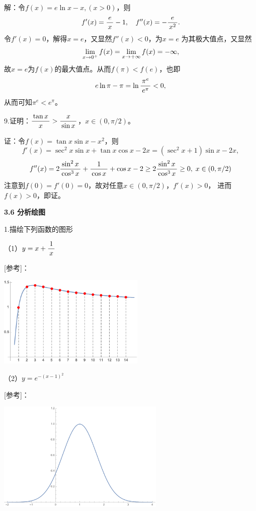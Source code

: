 
解：令$f(x)=e\ln x-x,(x>0)$，则
$$f'(x)=\displaystyle\frac{\,{e}\,}{\,{x}\,}-1,\quad f''(x)=-\displaystyle\frac{\,{e}\,}{\,{x^2}\,}.$$
令$f'(x)=0$，解得$x=e$，又显然$f''(x)<0$，为$x=e$
为其极大值点，又显然
$$\lim\limits_{x\to{0^+}}f(x)=\lim\limits_{x\to{+\infty}}f(x)=-\infty,$$
故$x=e$为$f(x)$的最大值点。从而$f(\pi)<f(e)$，也即
$$e\ln\pi-\pi=\ln\displaystyle\frac{\,{\pi^e}\,}{\,{e^{\pi}}\,}
<0,$$
从而可知$\pi^e<e^{\pi}$。\fin

\bigskip

9.证明：$\displaystyle\frac{\,{\tan x}\,}{\,{x}\,}>\displaystyle\frac{\,{x}\,}{\,{\sin x}\,}$，$x\in(0,\pi/2)$。

证：令$f(x)=\tan x\sin x-x^2$，则
$$f'(x)=\sec^2x\sin x+\tan x\cos x-2x=(\sec^2x+1)\sin x-2x,$$
$$f''(x)
=2\displaystyle\frac{\,{\sin^2x}\,}{\,{\cos^3x}\,}+\displaystyle\frac{\,{1}\,}{\,{\cos x}\,}+\cos x-2
\geq 2\displaystyle\frac{\,{\sin^2x}\,}{\,{\cos^3x}\,}\geq 0,\;x\in(0,\pi/2)$$
注意到$f(0)=f'(0)=0$，故对任意$x\in(0,\pi/2)$，$f'(x)>0$，
进而$f(x)>0$，即证。
\fin

\begin{center}
	\bf 3.6 分析绘图
\end{center}

\bigskip

1.描绘下列函数的图形

（1）$y=x+\displaystyle\frac{\,{1}\,}{\,{x}\,}$

[参考]：
\begin{center}
	\includegraphics[width=7cm]{./images/ch03/x1x.pdf}
\end{center}

（2）$y=e^{-(x-1)^2}$

[参考]：
\begin{center}
	\includegraphics[width=8cm]{./images/ch03/e-2x.pdf}
\end{center}

